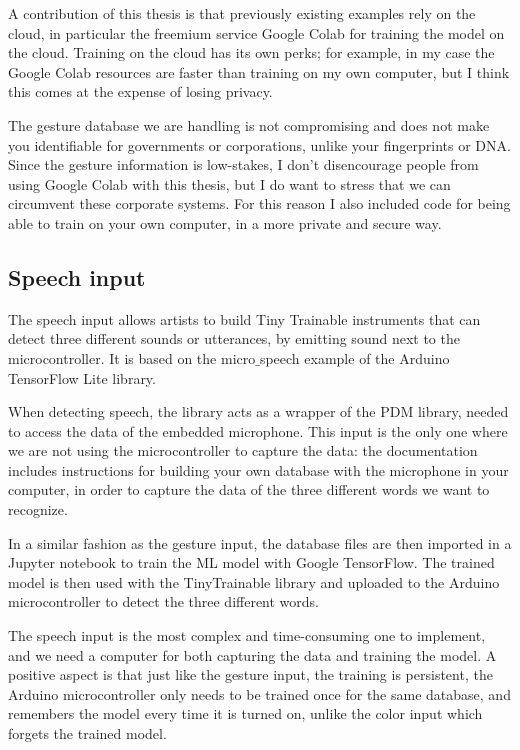 A contribution of this thesis is that previously existing examples rely on the cloud, in particular the freemium service Google Colab for training the model on the cloud. Training on the cloud has its own perks; for example, in my case the Google Colab resources are faster than training on my own computer, but I think this comes at the expense of losing privacy.

The gesture database we are handling is not compromising and does not make you identifiable for governments or corporations, unlike your fingerprints or DNA. Since the gesture information is low-stakes, I don't disencourage people from using Google Colab with this thesis, but I do want to stress that we can circumvent these corporate systems. For this reason I also included code for being able to train on your own computer, in a more private and secure way.

\subsection{Speech input}

The speech input allows artists to build Tiny Trainable instruments that can detect three different sounds or utterances, by emitting sound next to the microcontroller.  It is based on the micro$\_$speech example of the Arduino TensorFlow Lite library.

When detecting speech, the library acts as a wrapper of the PDM library, needed to access the data of the embedded microphone. This input is the only one where we are not using the microcontroller to capture the data: the documentation includes instructions for building your own database with the microphone in your computer, in order to capture the data of the three different words we want to recognize. 

In a similar fashion as the gesture input, the database files are then imported in a Jupyter notebook to train the \acrshort{ML} model with Google TensorFlow. The trained model is then used with the TinyTrainable library and uploaded to the Arduino microcontroller to detect the three different words.

The speech input is the most complex and time-consuming one to implement, and we need a computer for both capturing the data and training the model. A positive aspect is that just like the gesture input, the training is persistent, the Arduino microcontroller only needs to be trained once for the same database, and remembers the model every time it is turned on, unlike the color input which forgets the trained model.

